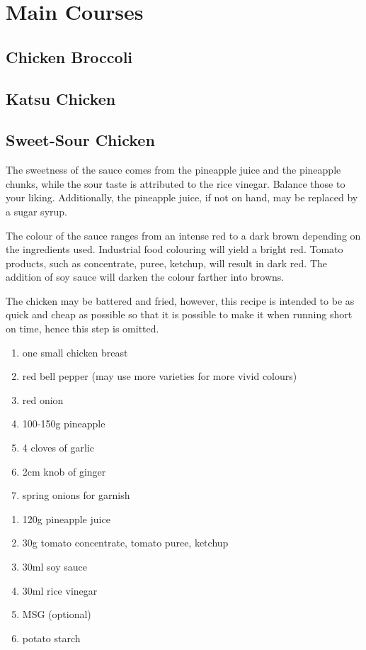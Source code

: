 \chapter{Main Courses}
\section{Chicken Broccoli}
\section{Katsu Chicken}
\section{Sweet-Sour Chicken}
The sweetness of the sauce comes from the pineapple juice and the pineapple
chunks, while the sour taste is attributed to the rice vinegar. Balance those
to your liking. Additionally, the pineapple juice, if not on hand, may be
replaced by a sugar syrup.

The colour of the sauce ranges from an intense red to a dark brown depending on
the ingredients used. Industrial food colouring will yield a bright red. Tomato
products, such as concentrate, puree, ketchup, will result in dark red. The
addition of soy sauce will darken the colour farther into browns.

The chicken may be battered and fried, however, this recipe is intended to be
as quick and cheap as possible so that it is possible to make it when running
short on time, hence this step is omitted.


\begin{enumerate}
  \item one small chicken breast
  \item red bell pepper (may use more varieties for more vivid colours)
  \item red onion
  \item 100-150g pineapple
  \item 4 cloves of garlic
  \item 2cm knob of ginger
  \item spring onions for garnish
\end{enumerate}

\begin{enumerate}
  \item 120g pineapple juice
  \item 30g tomato concentrate, tomato puree, ketchup
  \item 30ml soy sauce
  \item 30ml rice vinegar
  \item MSG (optional)
  \item potato starch
\end{enumerate}

